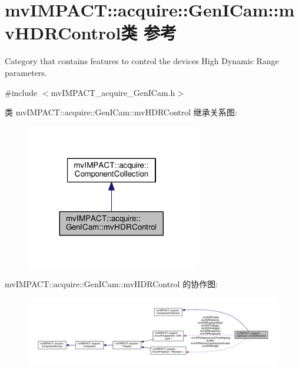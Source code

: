 \hypertarget{classmv_i_m_p_a_c_t_1_1acquire_1_1_gen_i_cam_1_1mv_h_d_r_control}{\section{mv\+I\+M\+P\+A\+C\+T\+:\+:acquire\+:\+:Gen\+I\+Cam\+:\+:mv\+H\+D\+R\+Control类 参考}
\label{classmv_i_m_p_a_c_t_1_1acquire_1_1_gen_i_cam_1_1mv_h_d_r_control}
}


Category that contains features to control the devices High Dynamic Range parameters.  




{\ttfamily \#include $<$mv\+I\+M\+P\+A\+C\+T\+\_\+acquire\+\_\+\+Gen\+I\+Cam.\+h$>$}



类 mv\+I\+M\+P\+A\+C\+T\+:\+:acquire\+:\+:Gen\+I\+Cam\+:\+:mv\+H\+D\+R\+Control 继承关系图\+:
\nopagebreak
\begin{figure}[H]
\begin{center}
\leavevmode
\includegraphics[width=212pt]{classmv_i_m_p_a_c_t_1_1acquire_1_1_gen_i_cam_1_1mv_h_d_r_control__inherit__graph}
\end{center}
\end{figure}


mv\+I\+M\+P\+A\+C\+T\+:\+:acquire\+:\+:Gen\+I\+Cam\+:\+:mv\+H\+D\+R\+Control 的协作图\+:
\nopagebreak
\begin{figure}[H]
\begin{center}
\leavevmode
\includegraphics[width=350pt]{classmv_i_m_p_a_c_t_1_1acquire_1_1_gen_i_cam_1_1mv_h_d_r_control__coll__graph}
\end{center}
\end{figure}
